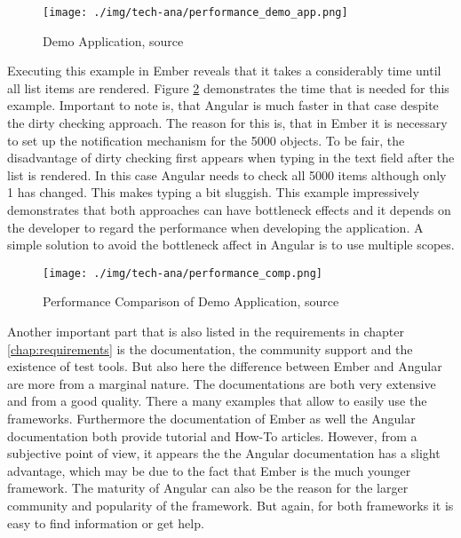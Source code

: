 \begin{figure}
	\centering	
	\texttt{[image: ./img/tech-ana/performance\_demo\_app.png]}
	\caption{Demo Application, source \autocite{binding_comparison}}
	\label{fig:demo_app}
\end{figure} 

Executing this example in Ember reveals that it takes a considerably time until all list items are rendered.
Figure \ref{fig:performance_demo_app} demonstrates the time that is needed for this example. 
Important to note is, that Angular is much faster in that case despite the dirty checking approach. 
The reason for this is, that in Ember it is necessary to set up the notification mechanism for the 5000 objects.
To be fair, the disadvantage of dirty checking first appears when typing in the text field after the list is rendered. 
In this case Angular needs to check all 5000 items although only 1 has changed. 
This makes typing a bit sluggish. 
This example impressively demonstrates that both approaches can have bottleneck effects and it depends on the developer to regard the performance when developing the application. 
A simple solution to avoid the bottleneck affect in Angular is to use multiple scopes.

\begin{figure}
	\centering	
	\texttt{[image: ./img/tech-ana/performance\_comp.png]}
	\caption{Performance Comparison of Demo Application, source \autocite{binding_comparison}}
	\label{fig:performance_demo_app}
\end{figure} 

Another important part that is also listed in the requirements in chapter \ref{chap:requirements} is the documentation, the community support and the existence of test tools. 
But also here the difference between Ember and Angular are more from a marginal nature. 
The documentations are both very extensive and from a good quality. 
There a many examples that allow to easily use the frameworks. 
Furthermore the documentation of  Ember as well the Angular documentation both provide tutorial and How-To articles. 
However, from a subjective point of view, it appears the the Angular documentation has a slight advantage, which may be due to the fact that Ember is the much younger framework. 
The maturity of Angular can also be the reason for the larger community and popularity of the framework. 
But again, for both frameworks it is easy to find information or get help. 


